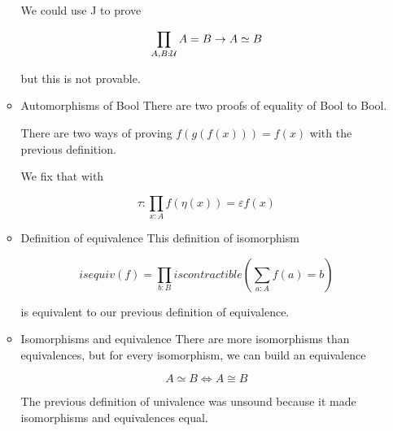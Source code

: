 \documentclass[11pt]{article}
\begin{document}
\begin{itemize}
\begin{itemize}
We could use J to prove

\[
\prod_{A,B: {\cal U}} A=B \to A \simeq B
\]

but this is not provable.

\item Automorphisms of Bool
\label{sec-9-3-3-3-3}
There are two proofs of equality of Bool to Bool.

There are two ways of proving $f(g(f(x))) = f(x)$ with the previous
definition.

We fix that with

\[
\tau : \prod_{x:A} f(\eta (x)) = \varepsilon f(x)
\]

\item Definition of equivalence
\label{sec-9-3-3-3-4}
This definition of isomorphism 

\[
isequiv(f) = \prod_{b:B} iscontractible \left( \sum_{a:A} f(a) = b \right)
\]

is equivalent to our previous definition of equivalence.
\item Isomorphisms and equivalence
\label{sec-9-3-3-3-5}
There are more isomorphisms than equivalences, but for every
isomorphism, we can build an equivalence

\[
A \simeq B \iff A\cong B
\]

The previous definition of univalence was unsound because it
made isomorphisms and equivalences equal.
\end{itemize}
\end{itemize}
\end{document}
